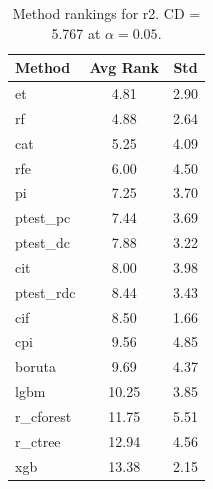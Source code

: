 \begin{table}[h]
\centering
\caption{Method rankings for r2. CD = 5.767 at $\alpha=0.05$.}
\label{tab:ranks_r2}
\begin{tabular}{lcc}
\toprule
Method & Avg Rank & Std \\
\midrule
et & 4.81 & 2.90 \\
rf & 4.88 & 2.64 \\
cat & 5.25 & 4.09 \\
rfe & 6.00 & 4.50 \\
pi & 7.25 & 3.70 \\
ptest_pc & 7.44 & 3.69 \\
ptest_dc & 7.88 & 3.22 \\
cit & 8.00 & 3.98 \\
ptest_rdc & 8.44 & 3.43 \\
cif & 8.50 & 1.66 \\
cpi & 9.56 & 4.85 \\
boruta & 9.69 & 4.37 \\
lgbm & 10.25 & 3.85 \\
r_cforest & 11.75 & 5.51 \\
r_ctree & 12.94 & 4.56 \\
xgb & 13.38 & 2.15 \\
\bottomrule
\end{tabular}
\end{table}